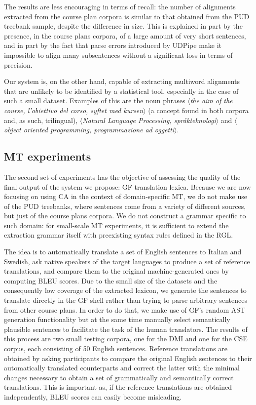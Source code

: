 \documentclass[11pt]{article}
\begin{document}
The results are less encouraging in terms of recall: the number of alignments extracted from the course plan corpora is similar to that obtained from the PUD treebank sample, despite the difference in size. 
This is explained in part by the presence, in the course plans corpora, of a large amount of very short sentences, and in part by the fact that parse errors introduced by UDPipe make it impossible to align many subsentences without a significant loss in terms of precision.  

Our system is, on the other hand, capable of extracting multiword alignments that are unlikely to be identified by a statistical tool, especially in the case of such a small dataset. Examples of this are the noun phrases  $\langle$\textit{the aim of the course, l'obiettivo del corso, syftet med kursen}$\rangle$ (a concept found in both corpora and, as such, trilingual), $\langle$\textit{Natural Language Processing, språkteknologi}$\rangle$ and $\langle$\textit{object oriented programming, programmazione ad oggetti}$\rangle$.

\subsection{MT experiments} \label{mtexp}
The second set of experiments has the objective of assessing the quality of the final output of the system we propose: GF translation lexica. 
Because we are now focusing on using CA in the context of domain-specific MT, we do not make use of the PUD treebanks, where sentences come from a variety of different sources, but just of the course plans corpora. 
We do not construct a grammar specific to such domain: for small-scale MT experiments, it is sufficient to extend the extraction grammar itself with preexisting syntax rules defined in the RGL. 

The idea is to automatically translate a set of English sentences to Italian and Swedish, ask native speakers of the target languages to produce a set of reference translations, and compare them to the original machine-generated ones by computing BLEU scores.
Due to the small size of the datasets and the consequently low coverage of the extracted lexicon, we generate the sentences to translate directly in the GF shell rather than trying to parse arbitrary sentences from other course plans. 
In order to do that, we make use of GF's random AST generation functionality but at the same time manually select semantically plausible sentences to facilitate the task of the human translators.
The results of this process are two small testing corpora, one for the DMI and one for the CSE corpus, each consisting of 50 English sentences. 
Reference translations are obtained by asking participants to compare the original English sentences to their automatically translated counterparts and correct the latter with the minimal changes necessary to obtain a set of grammatically and semantically correct translations. 
This is important as, if the reference translations are obtained independently, BLEU scores can easily become misleading.
\end{document}
